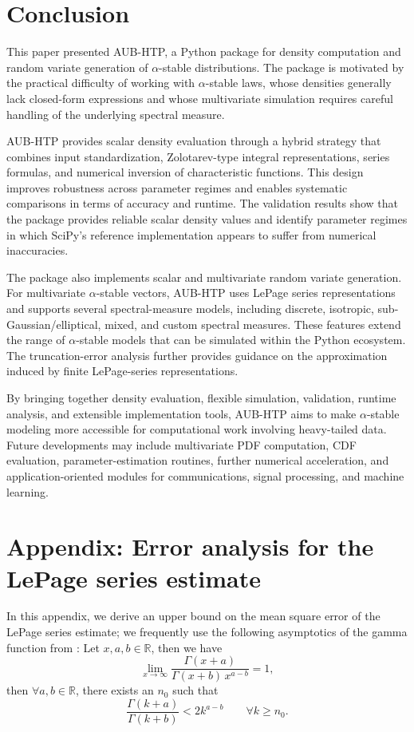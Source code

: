 \section{Conclusion}
This paper presented AUB-HTP, a Python package for density computation and random variate generation of $\alpha$-stable distributions. The package is motivated by the practical difficulty of working with $\alpha$-stable laws, whose densities generally lack closed-form expressions and whose multivariate simulation requires careful handling of the underlying spectral measure.

AUB-HTP provides scalar density evaluation through a hybrid strategy that combines input standardization, Zolotarev-type integral representations, series formulas, and numerical inversion of characteristic functions. This design improves robustness across parameter regimes and enables systematic comparisons in terms of accuracy and runtime. The validation results show that the package provides reliable scalar density values and identify parameter regimes in which SciPy's reference implementation appears to suffer from numerical inaccuracies.

The package also implements scalar and multivariate random variate generation. For multivariate $\alpha$-stable vectors, AUB-HTP uses LePage series representations and supports several spectral-measure models, including discrete, isotropic, sub-Gaussian/elliptical, mixed, and custom spectral measures. These features extend the range of $\alpha$-stable models that can be simulated within the Python ecosystem. The truncation-error analysis further provides guidance on the approximation induced by finite LePage-series representations.

By bringing together density evaluation, flexible simulation, validation, runtime analysis, and extensible implementation tools, AUB-HTP aims to make $\alpha$-stable modeling more accessible for computational work involving heavy-tailed data. Future developments may include multivariate PDF computation, CDF evaluation, parameter-estimation routines, further numerical acceleration, and application-oriented modules for communications, signal processing, and machine learning.

\appendix
\section{Appendix: Error analysis for the LePage series estimate}

In this appendix, we derive an upper bound on the mean square error of the LePage series estimate; we frequently use the following asymptotics of the gamma function from \cite{NIST:DLMF}: Let $x,a,b\in\mathbb{R}$, then we have
\[
\lim_{x \to \infty} \frac{\Gamma(x+a)}{\Gamma(x+b) \, x^{a-b}} = 1,
\]
then $\forall a,b \in\mathbb{R}$, there exists an $n_0$ such that \begin{equation}\label{eq:eq12}
    \frac{\Gamma(k+a)}{\Gamma(k+b)} <2{k^{a-b}} \qquad \forall k\geq n_0.
\end{equation}

